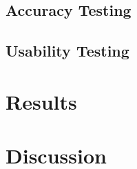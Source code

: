 
\subsection{Accuracy Testing}



\subsection{Usability Testing}



\section{Results}





\section{Discussion}

